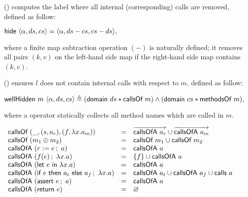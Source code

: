 () computes the label where all internal (corresponding) calls
are removed, defined as follow:

\begin{definition}
  \label{def-hide}
  \mbox{}
  \begin{center}
    \begin{math}
      \hide{\semlbl{\alpha}{ds}{cs}} = \semlbl{\alpha}{ds - cs}{cs - ds},
    \end{math}
  \end{center}
\end{definition}
where a finite map subtraction operation $(-)$ is naturally defined; it
removes all pairs $(k, v)$ on the left-hand side map if the right-hand
side map contains $(k, v)$.

() ensures $l$ does not contain internal calls with
respect to $m$, defined as follow:

\begin{definition}
  \label{def-wellhidden}
  \mbox{}
  \begin{center}
    \begin{math}
      \wellhidden{m}{\semlbl{\alpha}{ds}{cs}} \triangleq
      (\keysdisj{ds}{\callsofm{m}}) \wedge (\keysdisj{cs}{\methsofm{m}}),
    \end{math}
  \end{center}
\end{definition}
where a  operator statically collects all method names
which are called in $m$.

\begin{definition}
  \label{def-callsof}
  \mbox{}
  \begin{center}
    \begin{math}
      \begin{array}{lcl}
        \callsofm{(\_, \rulepair{s}{a_r}, \methodpair{f}{\lambda x.a_m})}
        & = & \listof{\callsofa{a_r}} \cup \listof{\callsofa{a_m}} \\
        \callsofm{(\modcomp{m_1}{m_2})} & = & \callsofm{m_1} \cup \callsofm{m_2} \\
        \callsofa{(\actwrite{r}{e}{a})} & = & \callsofa{a} \\
        \callsofa{(\actcall{x}{f}{e}{a})} & = & \{ f \} \cup \callsofa{a} \\
        \callsofa{(\actlet{e}{x}{a})} & = & \callsofa{a} \\
        \callsofa{(\actifelse{e}{a_t}{a_f}{x}{a})} & = & \callsofa{a_t} \cup \callsofa{a_f} \cup \callsof{a} \\
        \callsofa{(\actassert{e}{a})} & = & \callsofa{a} \\
        \callsofa{(\actret{e})} & = & \emptyset \\
      \end{array}
    \end{math}
  \end{center}
\end{definition}

